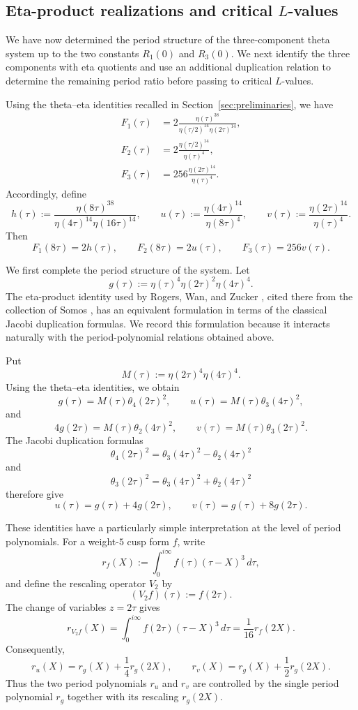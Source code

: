 \documentclass[preprint,12pt]{elsarticle}
\theoremstyle{definition}
\theoremstyle{remark}
\begin{document}
\subsection{Eta-product realizations and critical $L$-values}

We have now determined the period structure of the three-component theta system up to the two constants $R_1(0)$ and $R_3(0)$.  We next identify the three components with eta quotients and use an additional duplication relation to determine the remaining period ratio before passing to critical $L$-values.

Using the theta--eta identities recalled in Section~\ref{sec:preliminaries}, we have
\begin{align*}
	F_1(\tau)&=2\frac{\eta(\tau)^{38}}{\eta(\tau/2)^{14}\eta(2\tau)^{14}},\\
	F_2(\tau)&=2\frac{\eta(\tau/2)^{14}}{\eta(\tau)^4},\\
	F_3(\tau)&=256\frac{\eta(2\tau)^{14}}{\eta(\tau)^4}.
\end{align*}
Accordingly, define
\[
h(\tau):=\frac{\eta(8\tau)^{38}}{\eta(4\tau)^{14}\eta(16\tau)^{14}},\qquad
u(\tau):=\frac{\eta(4\tau)^{14}}{\eta(8\tau)^4},\qquad
v(\tau):=\frac{\eta(2\tau)^{14}}{\eta(\tau)^4}.
\]
Then
\[
F_1(8\tau)=2h(\tau),\qquad F_2(8\tau)=2u(\tau),\qquad F_3(\tau)=256v(\tau).
\]

We first complete the period structure of the system.  Let
\[
g(\tau):=\eta(\tau)^4\eta(2\tau)^2\eta(4\tau)^4.
\]
The eta-product identity used by Rogers, Wan, and Zucker \cite{MR3338042}, cited there from the collection of Somos \cite{SomosEta}, has an equivalent formulation in terms of the classical Jacobi duplication formulas.  We record this formulation because it interacts naturally with the period-polynomial relations obtained above.

Put
\[
M(\tau):=\eta(2\tau)^4\eta(4\tau)^4.
\]
Using the theta--eta identities, we obtain
\[
g(\tau)=M(\tau)\theta_4(2\tau)^2,\qquad u(\tau)=M(\tau)\theta_3(4\tau)^2,
\]
and
\[
4g(2\tau)=M(\tau)\theta_2(4\tau)^2,\qquad v(\tau)=M(\tau)\theta_3(2\tau)^2.
\]
The Jacobi duplication formulas
\[
\theta_4(2\tau)^2=\theta_3(4\tau)^2-\theta_2(4\tau)^2
\]
and
\[
\theta_3(2\tau)^2=\theta_3(4\tau)^2+\theta_2(4\tau)^2
\]
therefore give
\[
u(\tau)=g(\tau)+4g(2\tau),\qquad v(\tau)=g(\tau)+8g(2\tau).
\]

These identities have a particularly simple interpretation at the level of period polynomials.  For a weight-$5$ cusp form $f$, write
\[
r_f(X):=\int_0^{i\infty}f(\tau)(\tau-X)^3\,d\tau,
\]
and define the rescaling operator $V_2$ by
\[
(V_2f)(\tau):=f(2\tau).
\]
The change of variables $z=2\tau$ gives
\[
r_{V_2f}(X)=\int_0^{i\infty}f(2\tau)(\tau-X)^3\,d\tau=\frac{1}{16}r_f(2X).
\]
Consequently,
\[
r_u(X)=r_g(X)+\frac{1}{4}r_g(2X),\qquad r_v(X)=r_g(X)+\frac{1}{2}r_g(2X).
\]
Thus the two period polynomials $r_u$ and $r_v$ are controlled by the single period polynomial $r_g$ together with its rescaling $r_g(2X)$.
\end{document}
